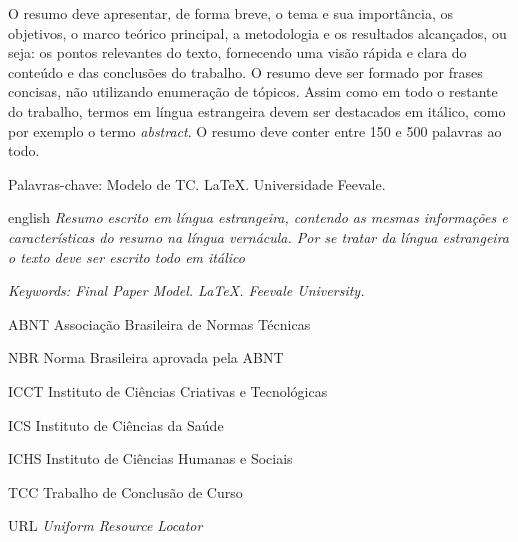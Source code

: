 \documentclass[
	12pt,				%
    oneside,			%
	a4paper,			%
	english,			%
	french,				%
	spanish,			%
	brazil,				%
	]{abntex2-modificado}
\begin{document}
\begin{resumo}
 \noindent
 O resumo deve apresentar, de forma breve, o tema e sua importância, os objetivos, o marco teórico principal, a metodologia e os resultados alcançados, ou seja: os pontos relevantes do texto, fornecendo uma visão rápida e clara do conteúdo e das conclusões do trabalho. O resumo deve ser formado por frases concisas, não utilizando enumeração de tópicos. Assim como em todo o restante do trabalho, termos em língua estrangeira devem ser destacados em itálico, como por exemplo o termo \textit{abstract}. O resumo deve conter entre 150 e 500 palavras ao todo.

 \vspace{\onelineskip}
    
 \noindent
 Palavras-chave:  Modelo de TC. LaTeX. Universidade Feevale.
\end{resumo}

\begin{resumo}[Abstract] 
\begin{otherlanguage*}{english}
 \noindent
 \textit{Resumo escrito em língua estrangeira, contendo as mesmas informações e características do resumo na língua vernácula. Por se tratar da língua estrangeira o texto deve ser escrito todo em itálico}

 \vspace{\onelineskip}
    
 \noindent
 \textit{Keywords: Final Paper Model. LaTeX. Feevale University.}
\end{otherlanguage*}
\end{resumo}


\listoffigures* %
\cleardoublepage %


\listoftables*
\cleardoublepage

\begin{siglas}
 \item[ABNT] Associação Brasileira de Normas Técnicas
 \item[NBR] Norma Brasileira aprovada pela ABNT
 \item[ICCT] Instituto de Ciências Criativas e Tecnológicas
 \item[ICS] Instituto de Ciências da Saúde
 \item[ICHS] Instituto de Ciências Humanas e Sociais
 \item[TCC] Trabalho de Conclusão de Curso
 \item[URL] \textit{Uniform Resource Locator}
\end{siglas}
\end{document}
